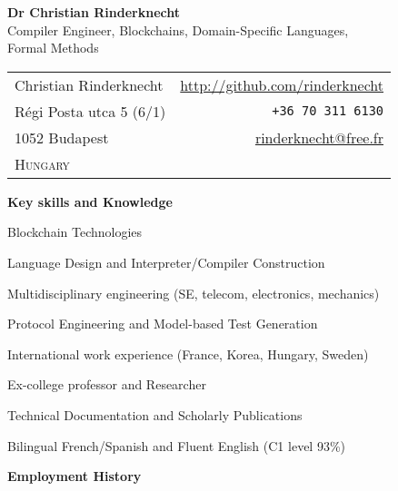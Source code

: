 \documentclass[a4paper,11pt]{article}
\begin{document}
\begin{center}
\textbf{\LARGE Dr Christian Rinderknecht}\\[5mm]
       {\large Compiler Engineer, Blockchains, Domain-Specific Languages, \\
         Formal Methods}
\end{center}

\noindent
\begin{tabular}{@{}l@{\qquad\qquad\qquad\qquad}r@{}}
  Christian Rinderknecht
& \url{http://github.com/rinderknecht}\\
  Régi Posta utca 5 (6/1)
& \texttt{+36 70 311 6130}\\
  1052 Budapest
& \url{rinderknecht@free.fr}\\
  \textsc{Hungary}
&
\end{tabular}

\medskip


\pagestyle{empty}

\bigskip
\noindent\textbf{\large Key skills and Knowledge}
\begin{itemize*}

  \item Blockchain Technologies

  \item Language Design and Interpreter/Compiler Construction

  \item Multidisciplinary engineering (SE, telecom, electronics, mechanics)

  \item Protocol Engineering and Model-based Test Generation

  \item International work experience (France, Korea, Hungary, Sweden)

  \item Ex-college professor and Researcher

  \item Technical Documentation and Scholarly Publications

  \item Bilingual French/Spanish and Fluent English (C1 level 93\%)

\end{itemize*}

\smallskip
\noindent\textbf{\large Employment History}
\bigskip
\end{document}

